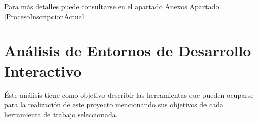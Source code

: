 	\noindent Para más detalles puede consultarse en el apartado Anexos Apartado \ref{ProcesoInscripcionActual}
	\pagebreak
	
	
	
	\section{An\'alisis de Entornos de Desarrollo Interactivo}
	\noindent Éste análisis tiene como objetivo describir las herramientas que pueden ocuparse para la realización de este proyecto mencionando sus objetivos de cada herramienta de trabajo seleccionada.
	
